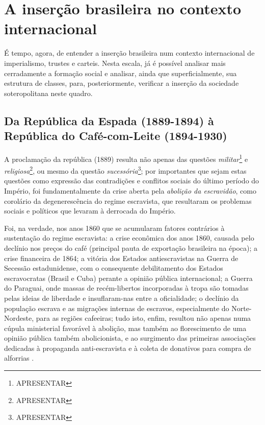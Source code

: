 \section{A inserção brasileira no contexto internacional}\label{sec:insbrascontint}

É tempo, agora, de entender a inserção brasileira num contexto internacional de imperialismo, trustes e carteis. Nesta escala, já é possível analisar mais cerradamente a formação social e analisar, ainda que superficialmente, sua estrutura de classes, para, posteriormente, verificar a inserção da sociedade soteropolitana neste quadro.

\subsection{Da República da Espada (1889-1894) à República do Café-com-Leite (1894-1930)}\label{subsec:espadaleite}

A proclamação da república (1889) resulta não apenas das questões \textit{militar}\footnote{APRESENTAR} e \textit{religiosa}\footnote{APRESENTAR}, ou mesmo da questão \textit{sucessória}\footnote{APRESENTAR}; por importantes que sejam estas questões como expressão das contradições e conflitos sociais do último período do Império, foi fundamentalmente da crise aberta pela \textit{abolição da escravidão}, como corolário da degenerescência do regime escravista, que resultaram os problemas sociais e políticos que levaram à derrocada do Império. 

Foi, na verdade, nos anos 1860 que se acumularam fatores contrários à sustentação do regime escravista: a crise econômica dos anos 1860, causada pelo declínio nos preços do café (principal pauta de exportação brasileira na época); a crise financeira de 1864; a vitória dos Estados antiescravistas na Guerra de Secessão estadunidense, com o consequente debilitamento dos Estados escravocratas (Brasil e Cuba) perante a opinião pública internacional; a Guerra do Paraguai, onde massas de recém-libertos incorporadas à tropa são tomadas pelas ideias de liberdade e insuflaram-nas entre a oficialidade; o declínio da população escrava e as migrações internas de escravos, especialmente do Norte-Nordeste, para as regiões cafeeiras; tudo isto, enfim, resultou não apenas numa cúpula ministerial favorável à abolição, mas também ao florescimento de uma opinião pública também abolicionista, e ao surgimento das primeiras associações dedicadas à propaganda anti-escravista e à coleta de donativos para compra de alforrias \cite[p.~141-143]{gorender_escrareab_1990}.

